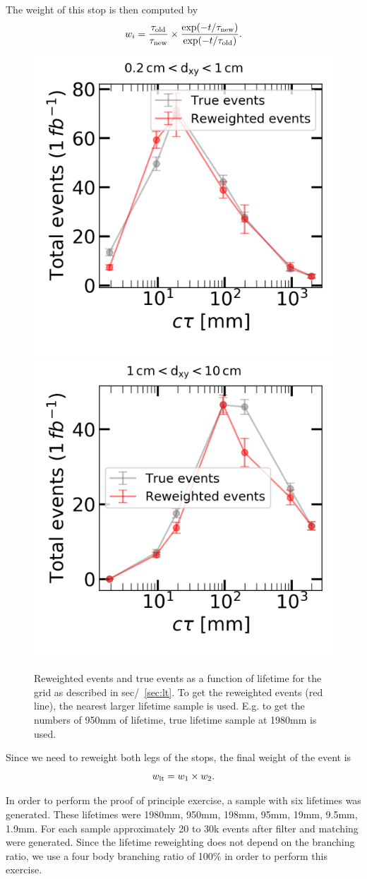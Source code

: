 \documentclass[prd,reprint,nofootinbib,notitlepage,aps,tightenlines,amsmath,amssymb,showpacs,superscriptaddress]{revtex4-1}
\begin{document}
The weight of this stop is then computed by 
\begin{equation}
    w_i = \frac{\tau_{\rm{old}}}{\tau_{\rm{new}}}\times \frac{\exp ( -t/\tau_{\rm{new}})}{\exp ( -t/\tau_{\rm{old}})}.
\end{equation}

\begin{figure}[tb]
  \includegraphics[width=0.45\columnwidth]{./figures/dxy_02_1_total_lt.png}%
  \includegraphics[width=0.45\columnwidth]{./figures/dxy1_10_total_lt.png}
 \caption{Reweighted events and true events as a function of lifetime for the grid as described in sec/~\ref{sec:lt}. To get the reweighted events (red line), the nearest larger lifetime sample is used. E.g. to get the numbers of 950mm of lifetime, true lifetime sample at 1980mm is used.  }
\label{fig:lt_reweight}
\end{figure}

Since we need to reweight both legs of the stops, the final weight of the event is
\begin{equation}
w_{\rm{lt}} = w_1 \times w_2.
\end{equation} 

In order to perform the proof of principle exercise, a sample with six lifetimes was generated. These lifetimes were 1980mm, 950mm, 198mm, 95mm, 19mm, 9.5mm, 1.9mm. For each sample approximately 20 to 30k events after filter and matching were generated. Since the lifetime reweighting does not depend on the branching ratio, we use a four body branching ratio of 100\% in order to perform this exercise. 
\end{document}
